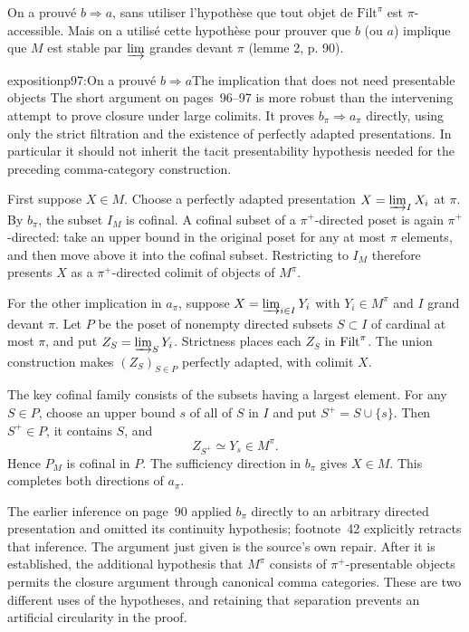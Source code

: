 On a prouvé $b\Longrightarrow a$, sans utiliser l'hypothèse que tout objet de $\mathrm{Filt}^\pi$ est $\pi$-accessible. Mais on a utilisé cette hypothèse pour prouver que $b$ (ou $a$) implique que $M$ est stable par $\varinjlim$ grandes devant $\pi$ (lemme 2, p. 90).

\begin{dcomment}{exposition}{p97:On a prouvé $b\Longrightarrow a$}{The implication that does not need presentable objects}
The short argument on pages~96--97 is more robust than the intervening attempt to prove closure under large colimits. It proves $b_\pi\Rightarrow a_\pi$ directly, using only the strict filtration and the existence of perfectly adapted presentations. In particular it should not inherit the tacit presentability hypothesis needed for the preceding comma-category construction.

First suppose $X\in M$. Choose a perfectly adapted presentation $X=\varinjlim_I X_i$ at $\pi$. By $b_\pi$, the subset $I_M$ is cofinal. A cofinal subset of a $\pi^+$-directed poset is again $\pi^+$-directed: take an upper bound in the original poset for any at most $\pi$ elements, and then move above it into the cofinal subset. Restricting to $I_M$ therefore presents $X$ as a $\pi^+$-directed colimit of objects of $M^\pi$.

For the other implication in $a_\pi$, suppose $X=\varinjlim_{i\in I}Y_i$ with $Y_i\in M^\pi$ and $I$ grand devant $\pi$. Let $P$ be the poset of nonempty directed subsets $S\subset I$ of cardinal at most $\pi$, and put $Z_S=\varinjlim_S Y_i$. Strictness places each $Z_S$ in $\mathrm{Filt}^\pi$. The union construction makes $(Z_S)_{S\in P}$ perfectly adapted, with colimit $X$.

The key cofinal family consists of the subsets having a largest element. For any $S\in P$, choose an upper bound $s$ of all of $S$ in $I$ and put $S^+=S\cup\{s\}$. Then $S^+\in P$, it contains $S$, and
\[
 Z_{S^+}\simeq Y_s\in M^\pi.
\]
Hence $P_M$ is cofinal in $P$. The sufficiency direction in $b_\pi$ gives $X\in M$. This completes both directions of $a_\pi$.

The earlier inference on page~90 applied $b_\pi$ directly to an arbitrary directed presentation and omitted its continuity hypothesis; footnote~42 explicitly retracts that inference. The argument just given is the source's own repair. After it is established, the additional hypothesis that $M^\pi$ consists of $\pi^+$-presentable objects permits the closure argument through canonical comma categories. These are two different uses of the hypotheses, and retaining that separation prevents an artificial circularity in the proof.
\end{dcomment}


